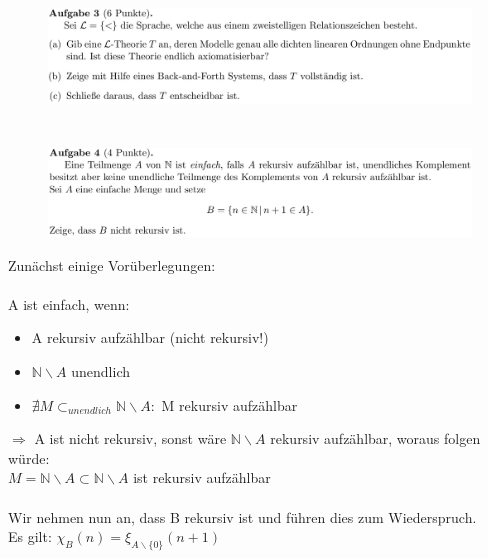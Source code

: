\documentclass[a4paper]{scrartcl}%
\begin{document}
\section*{}
\label{sec:aufgabe_3}

    \begin{figure}[H]
        \includegraphics[scale=0.3]{./A-3.png}
        \label{fig:}
    \end{figure}


\section*{}%
\label{sec:aufgabe_4}

    \begin{figure}[H]
        \includegraphics[scale=0.3]{./A-4.png}
        \label{fig:}
    \end{figure}

    Zunächst einige Vorüberlegungen:\\
    \\A ist einfach, wenn:\\
    \begin{itemize}
        \item A rekursiv aufzählbar (nicht rekursiv!)\\
        \item $ \mathds{N}\backslash A$ unendlich\\
        \item $\nexists M \subset_{unendlich} \mathds{N} \backslash A:$ M rekursiv aufzählbar\\
    \end{itemize}
    $\Rightarrow$ A ist nicht rekursiv, sonst wäre $ \mathds{N} \backslash A$ rekursiv aufzählbar, woraus folgen würde:\\
    $M = \mathds{N} \backslash A \subset \mathds{N} \backslash A$ ist rekursiv aufzählbar \lightning\\
    \\Wir nehmen nun an, dass B rekursiv ist und führen dies zum Wiederspruch.\\
    Es gilt: $\chi_B(n) = \xi_{A\backslash \{0\}}(n+1)$\\
\end{document}
